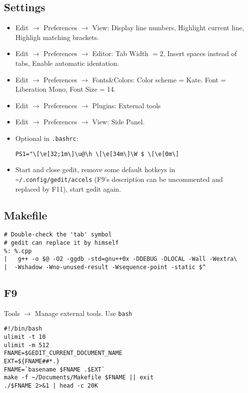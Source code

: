 \subsection{Settings}
\begin{itemize}
\item Edit $\to$ Preferences $\to$ View: Display line numbers, Highlight current line, Highligh matching brackets.
\item Edit $\to$ Preferences $\to$ Editor: Tab Width $=2$, Insert spaces instead of tabs, Enable automatic identation.
\item Edit $\to$ Preferences $\to$ Fonts\&Colors: Color scheme = Kate. Font = Liberation Mono, Font Size = 14.
\item Edit $\to$ Preferences $\to$ Plugins: External tools
\item Edit $\to$ Preferences $\to$ View: Side Panel.
\item Optional in \texttt{.bashrc}:
\begin{verbatim}
PS1="\[\e[32;1m\]\u@\h \[\e[34m\]\W $ \[\e[0m\]
\end{verbatim}
\item Start and close gedit, remove some default hotkeys in \texttt{\~{}/.config/gedit/accels} (F9's description can be
      uncommented and replaced by F11), start gedit again.
\end{itemize}

\subsection{Makefile}
\begin{verbatim}
# Double-check the 'tab' symbol
# gedit can replace it by himself
%: %.cpp
|	g++ -o $@ -O2 -ggdb -std=gnu++0x -DDEBUG -DLOCAL -Wall -Wextra\
|  -Wshadow -Wno-unused-result -Wsequence-point -static $^
\end{verbatim}

\subsection{F9}

Tools $\to$ Manage external tools. Use {\color{red}\texttt{bash}}

\begin{verbatim}
#!/bin/bash
ulimit -t 10
ulimit -m 512
FNAME=$GEDIT_CURRENT_DOCUMENT_NAME
EXT=${FNAME##*.}
FNAME=`basename $FNAME .$EXT`
make -f ~/Documents/Makefile $FNAME || exit
./$FNAME 2>&1 | head -c 20K
\end{verbatim}

